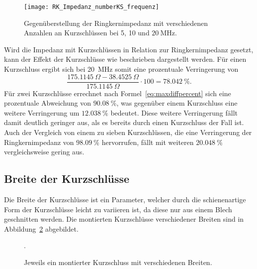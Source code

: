 \begin{figure}[htb]
	\centering
	\texttt{[image: RK\_Impedanz\_numberKS\_frequenz]}
	\caption{Gegen\"uberstellung der Ringkernimpedanz mit verschiedenen Anzahlen an Kurzschl\"ussen bei 5, 10 und $\SI{20}{\mega\hertz}$.}
	\label{fig:ringcorenumber20}
\end{figure}

Wird die Impedanz mit Kurzschlüssen in Relation zur Ringkernimpedanz gesetzt, kann der Effekt der Kurzschl\"usse wie beschrieben dargestellt werden. Für einen Kurzschluss ergibt sich bei \SI{20}{\mega\hertz} somit eine prozentuale Verringerung von 
\begin{equation}
	\frac{\SI{175,1145}{\Omega} - \SI{38,4525}{\Omega}}{\SI{175,1145}{\Omega}}\cdot 100 = \SI{78,042}{\%}.
	\label{eq:maxdiffpercentzeroone}
\end{equation}
Für zwei Kurzschlüsse errechnet nach Formel~\ref{eq:maxdiffpercent} sich eine prozentuale Abweichung von $\SI{90,08}{\%}$, was gegenüber einem Kurzschluss eine weitere Verringerung um $\SI{12,038}{\%}$ bedeutet. Diese weitere Verringerung fällt damit deutlich geringer aus, als es bereits durch einen Kurzschluss der Fall ist. Auch der Vergleich von einem zu sieben Kurzschlüssen, die eine Verringerung der Ringkernimpedanz von $\SI{98,09}{\%}$ hervorrufen, fällt mit weiteren $\SI{20,048}{\%}$ vergleichsweise gering aus.

\subsection{Breite der Kurzschl\"usse}
Die Breite der Kurzschl\"usse ist ein Parameter, welcher durch die schienenartige Form der Kurzschl\"usse leicht zu variieren ist, da diese nur aus einem Blech geschnitten werden. Die montierten Kurzschl\"usse verschiedener Breiten sind in Abbildung~\ref{fig:ringcorewidthCST} abgebildet.

\begin{figure}[htb]
	\centering.
	\hspace{0.02\textwidth}
	\hspace{0.02\textwidth}
	\caption{Jeweils ein montierter Kurzschluss mit verschiedenen Breiten.}
	\label{fig:ringcorewidthCST}
\end{figure}



